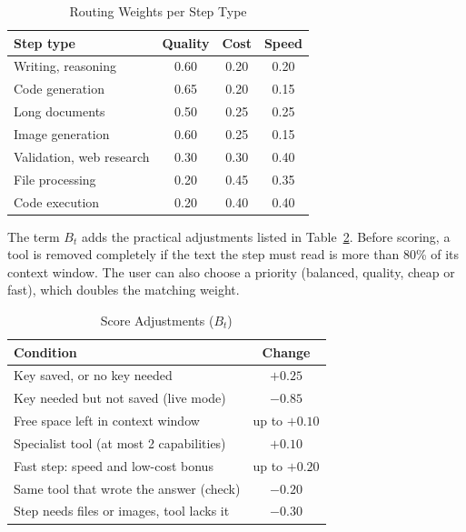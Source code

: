 \documentclass[conference]{IEEEtran}
\begin{document}
\begin{table}[htbp]
\caption{Routing Weights per Step Type}
\begin{center}
\begin{tabular}{@{}lccc@{}}
\toprule
\textbf{Step type} & \textbf{Quality} & \textbf{Cost} & \textbf{Speed} \\
\midrule
Writing, reasoning & 0.60 & 0.20 & 0.20 \\
Code generation & 0.65 & 0.20 & 0.15 \\
Long documents & 0.50 & 0.25 & 0.25 \\
Image generation & 0.60 & 0.25 & 0.15 \\
Validation, web research & 0.30 & 0.30 & 0.40 \\
File processing & 0.20 & 0.45 & 0.35 \\
Code execution & 0.20 & 0.40 & 0.40 \\
\bottomrule
\end{tabular}
\label{tab:weights}
\end{center}
\end{table}

The term $B_t$ adds the practical adjustments listed in Table~\ref{tab:bonus}. Before scoring, a tool is
removed completely if the text the step must read is more than 80\% of its context window. The user can
also choose a priority (balanced, quality, cheap or fast), which doubles the matching weight.

\begin{table}[htbp]
\caption{Score Adjustments ($B_t$)}
\begin{center}
\begin{tabular}{@{}lc@{}}
\toprule
\textbf{Condition} & \textbf{Change} \\
\midrule
Key saved, or no key needed & $+0.25$ \\
Key needed but not saved (live mode) & $-0.85$ \\
Free space left in context window & up to $+0.10$ \\
Specialist tool (at most 2 capabilities) & $+0.10$ \\
Fast step: speed and low-cost bonus & up to $+0.20$ \\
Same tool that wrote the answer (check) & $-0.20$ \\
Step needs files or images, tool lacks it & $-0.30$ \\
\bottomrule
\end{tabular}
\label{tab:bonus}
\end{center}
\end{table}
\end{document}
